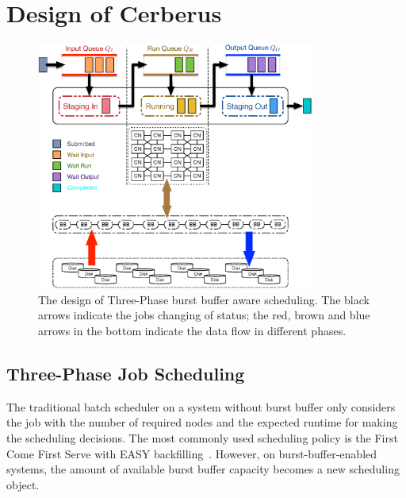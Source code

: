 \section{Design of Cerberus}
\label{Sec:Scheduler}

\begin{figure}[htp]
        \centering
        \includegraphics[width=3.6in]{CerberusBBSystem}
        \caption{The design of Three-Phase burst buffer aware scheduling. The black arrows indicate 
        the jobs changing of status; the red, brown and blue arrows in the bottom indicate the data flow in different phases.}
        \label{Fig:CerberusBBSystem}
\end{figure}


\subsection{Three-Phase Job Scheduling}

The traditional batch scheduler on a system without burst buffer only considers
the job with the number of required nodes and the expected runtime
for making the scheduling decisions.
The most commonly used scheduling policy is the First Come First Serve with EASY backfilling~\cite{tsafrir-tpds-2007}.
However, on burst-buffer-enabled systems,
the amount of available burst buffer capacity becomes a new scheduling object.

